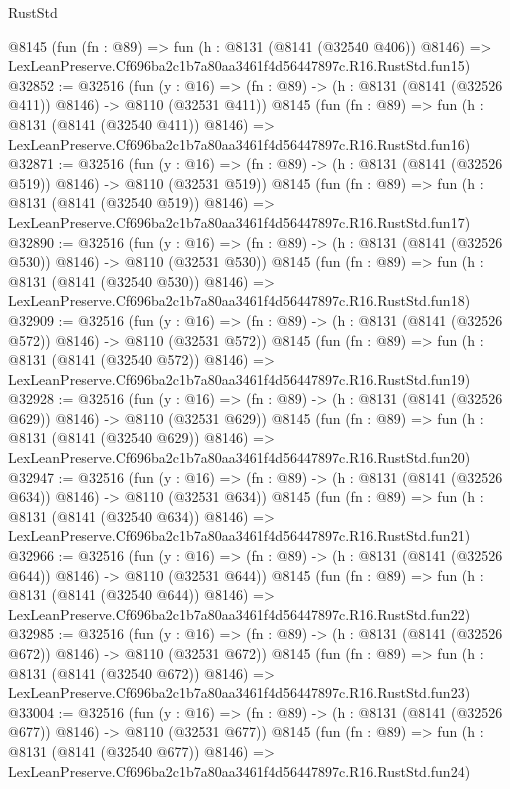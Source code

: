 \begin{lexlean}{RustStd}
\begin{coremodule}
    @8145
    (fun (fn : @89) =>
    fun (h : @8131 (@8141 (@32540 @406)) @8146) =>
    LexLeanPreserve.Cf696ba2c1b7a80aa3461f4d56447897c.R16.RustStd.fun15)
@32852 := @32516
    (fun (y : @16) => (fn : @89) -> (h : @8131 (@8141 (@32526 @411)) @8146) -> @8110 (@32531 @411))
    @8145
    (fun (fn : @89) =>
    fun (h : @8131 (@8141 (@32540 @411)) @8146) =>
    LexLeanPreserve.Cf696ba2c1b7a80aa3461f4d56447897c.R16.RustStd.fun16)
@32871 := @32516
    (fun (y : @16) => (fn : @89) -> (h : @8131 (@8141 (@32526 @519)) @8146) -> @8110 (@32531 @519))
    @8145
    (fun (fn : @89) =>
    fun (h : @8131 (@8141 (@32540 @519)) @8146) =>
    LexLeanPreserve.Cf696ba2c1b7a80aa3461f4d56447897c.R16.RustStd.fun17)
@32890 := @32516
    (fun (y : @16) => (fn : @89) -> (h : @8131 (@8141 (@32526 @530)) @8146) -> @8110 (@32531 @530))
    @8145
    (fun (fn : @89) =>
    fun (h : @8131 (@8141 (@32540 @530)) @8146) =>
    LexLeanPreserve.Cf696ba2c1b7a80aa3461f4d56447897c.R16.RustStd.fun18)
@32909 := @32516
    (fun (y : @16) => (fn : @89) -> (h : @8131 (@8141 (@32526 @572)) @8146) -> @8110 (@32531 @572))
    @8145
    (fun (fn : @89) =>
    fun (h : @8131 (@8141 (@32540 @572)) @8146) =>
    LexLeanPreserve.Cf696ba2c1b7a80aa3461f4d56447897c.R16.RustStd.fun19)
@32928 := @32516
    (fun (y : @16) => (fn : @89) -> (h : @8131 (@8141 (@32526 @629)) @8146) -> @8110 (@32531 @629))
    @8145
    (fun (fn : @89) =>
    fun (h : @8131 (@8141 (@32540 @629)) @8146) =>
    LexLeanPreserve.Cf696ba2c1b7a80aa3461f4d56447897c.R16.RustStd.fun20)
@32947 := @32516
    (fun (y : @16) => (fn : @89) -> (h : @8131 (@8141 (@32526 @634)) @8146) -> @8110 (@32531 @634))
    @8145
    (fun (fn : @89) =>
    fun (h : @8131 (@8141 (@32540 @634)) @8146) =>
    LexLeanPreserve.Cf696ba2c1b7a80aa3461f4d56447897c.R16.RustStd.fun21)
@32966 := @32516
    (fun (y : @16) => (fn : @89) -> (h : @8131 (@8141 (@32526 @644)) @8146) -> @8110 (@32531 @644))
    @8145
    (fun (fn : @89) =>
    fun (h : @8131 (@8141 (@32540 @644)) @8146) =>
    LexLeanPreserve.Cf696ba2c1b7a80aa3461f4d56447897c.R16.RustStd.fun22)
@32985 := @32516
    (fun (y : @16) => (fn : @89) -> (h : @8131 (@8141 (@32526 @672)) @8146) -> @8110 (@32531 @672))
    @8145
    (fun (fn : @89) =>
    fun (h : @8131 (@8141 (@32540 @672)) @8146) =>
    LexLeanPreserve.Cf696ba2c1b7a80aa3461f4d56447897c.R16.RustStd.fun23)
@33004 := @32516
    (fun (y : @16) => (fn : @89) -> (h : @8131 (@8141 (@32526 @677)) @8146) -> @8110 (@32531 @677))
    @8145
    (fun (fn : @89) =>
    fun (h : @8131 (@8141 (@32540 @677)) @8146) =>
    LexLeanPreserve.Cf696ba2c1b7a80aa3461f4d56447897c.R16.RustStd.fun24)

\end{coremodule}
\end{lexlean}
